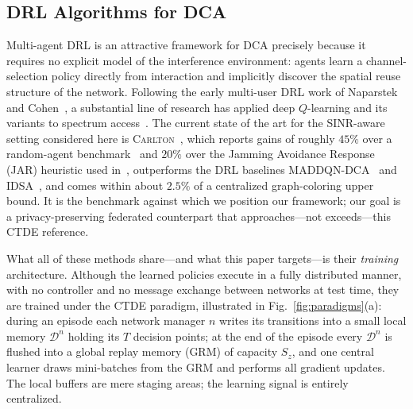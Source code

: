 \documentclass[journal]{IEEEtran}
\newcommand{\CARLTON}{\textsc{Carlton}}
\begin{document}
\subsection{DRL Algorithms for DCA}
\label{subsec:intro_related}

Multi-agent DRL is an attractive framework for DCA precisely because it
requires no explicit model of the interference environment: agents learn a
channel-selection policy directly from interaction and implicitly discover the
spatial reuse structure of the network. Following the early multi-user DRL work
of Naparstek and Cohen~\cite{naparstek2019deep}, a substantial line of research
has applied deep $Q$-learning and its variants to spectrum
access~\cite{adeogun2023distributed,kaur2023deep,du2022multi}. The current
state of the art for the SINR-aware setting considered here is
\CARLTON{}~\cite{cohen2024carlton}, which reports gains of roughly $45\%$ over
a random-agent benchmark~\cite{cohen2017distributed} and $20\%$ over the
Jamming Avoidance Response (JAR) heuristic used
in~\cite{cohen2024carlton}, outperforms the DRL baselines
MADDQN-DCA~\cite{adeogun2023distributed} and IDSA~\cite{kaur2023deep}, and
comes within about $2.5\%$ of a centralized graph-coloring upper bound. It is
the benchmark against which we position our framework; our goal is a
privacy-preserving federated counterpart that approaches---not
exceeds---this CTDE reference.

What all of these methods share---and what this paper targets---is their
\emph{training} architecture. Although the learned policies execute in a fully
distributed manner, with no controller and no message exchange between networks
at test time, they are trained under the CTDE paradigm, illustrated in
Fig.~\ref{fig:paradigms}(a): during an episode each network manager $n$ writes
its transitions into a small local memory $\mathcal{D}^{n}$ holding its $T$
decision points; at the end of the episode every $\mathcal{D}^{n}$ is flushed
into a global replay memory (GRM) of capacity $S_{z}$, and one central learner
draws mini-batches from the GRM and performs all gradient updates. The local
buffers are mere staging areas; the learning signal is entirely centralized.
\end{document}
